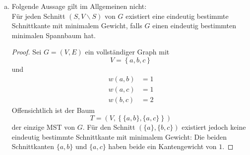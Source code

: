 \documentclass[a4paper]{scrartcl}
\begin{document}
\begin{enumerate}[(a)]
    \item
        \begin{behaupt}
            Folgende Aussage gilt im Allgemeinen nicht: \\
            Für jeden Schnitt $(S, V \backslash S)$ von $G$ existiert eine
            eindeutig bestimmte Schnittkante mit minimalem Gewicht, falls $G$
            einen eindeutig bestimmten minimalen Spannbaum hat.
        \end{behaupt}
        \begin{proof}
            Sei $G = (V, E)$ ein vollständiger Graph mit
            \begin{equation}
                V = \left\{ a, b, c \right\}
            \end{equation}
            und
            \begin{equation}
                \begin{split}
                    w(a, b) &= 1 \\
                    w(a, c) &= 1 \\
                    w(b, c) &= 2
                \end{split}
            \end{equation}
            Offensichtlich ist der Baum
            \begin{equation}
                T = \left(V, \left\{ \{a,b\}, \{a,c\} \right\} \right)
            \end{equation}
            der einzige MST von $G$.
            Für den Schnitt $(\{a\}, \{b,c\})$ existiert jedoch keine eindeutig
            bestimmte Schnittkante mit minimalem Gewicht:
            Die beiden Schnittkanten $\{ a,b \}$ und $\{ a,c \}$ haben beide ein
            Kantengewicht von $1$.
        \end{proof}

\end{enumerate}
\end{document}
